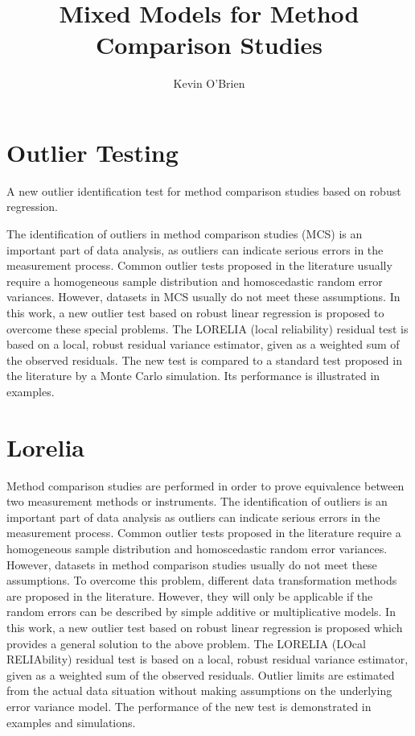 \documentclass[12pt, a4paper]{article}
\begin{document}
\author{Kevin O'Brien}
\title{Mixed Models for Method Comparison Studies}
\tableofcontents

	\section{Outlier Testing} 
	A new outlier identification test for method comparison studies based on robust regression.
	
	The identification of outliers in method comparison studies (MCS) is an important part of data analysis, as outliers can indicate serious errors in the measurement process. Common outlier tests proposed in the literature usually require a homogeneous sample distribution and homoscedastic random error variances. However, datasets in MCS usually do not meet these assumptions. In this work, a new outlier test based on robust linear regression is proposed to overcome these special problems. The LORELIA (local reliability) residual test is based on a local, robust residual variance estimator, given as a weighted sum of the observed residuals. The new test is compared to a standard test proposed in the literature by a Monte Carlo simulation. Its performance is illustrated in examples.
	
\section{Lorelia}


Method comparison studies are performed in order to prove equivalence between two measurement methods or instruments. The identification of outliers is an important part of data analysis as outliers can indicate serious errors in the measurement process. Common outlier tests 
proposed in the literature require a homogeneous sample distribution and homoscedastic random error variances. However, datasets in method comparison studies usually do not meet these assumptions. To overcome this problem, different data transformation methods are proposed in the literature. However, they will only be applicable if the random errors can be described by simple additive or multiplicative models. In this work, a new outlier test based on robust linear regression is proposed which provides a general solution to the above problem. The LORELIA (LOcal RELIAbility) residual test is based on a local, robust residual variance estimator, given as a weighted sum of the observed residuals. Outlier limits are estimated from the actual data situation without making assumptions on the underlying error variance model. The performance of the new test is demonstrated in examples and simulations.
\end{document}
